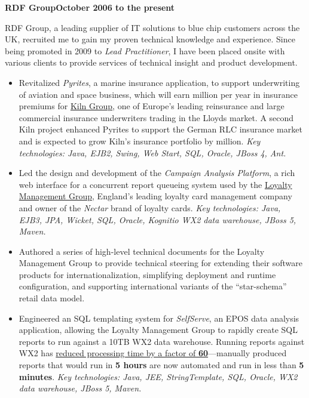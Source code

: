 \documentclass[a4paper,12pt]{article}
\newcommand{\head}[1]{\begin{center}{\large{\textbf{\sc{#1}}}}\nopagebreak\end{center}}
\newcommand{\jobheld}[2]{\textbf{#1\hfill #2}\nopagebreak}
\newcommand{\clientwork}[2]{\emph{#1\hfill #2}\nopagebreak}
\begin{document}
\head{Professional Experience}

\jobheld{RDF Group}{October 2006 to the present}

RDF Group, a leading supplier of IT solutions to blue chip customers across the UK, recruited me to gain my proven technical knowledge and experience.  Since being promoted in 2009 to \emph{Lead Practitioner}, I have been placed onsite with various clients to provide services of technical insight and product development.


\begin{itemize}

\item Revitalized \emph{Pyrites}, a marine insurance application, to support underwriting of aviation and space business, which will earn  million per year in insurance premiums for \href{http://www.kilngroup.com/}{Kiln Group}, one of Europe's leading reinsurance and large commercial insurance underwriters trading in the Lloyds market.  A second Kiln project enhanced Pyrites to support the German RLC insurance market and is expected to grow  Kiln's insurance portfolio by  million.  \emph{Key technologies: Java, EJB2, Swing, Web Start, SQL, Oracle, JBoss 4, Ant.}

\item Led the design and development of the \emph{Campaign Analysis Platform}, a rich web interface for a concurrent report queueing system used by the \href{http://www.loyalty.co.uk/}{Loyalty Management Group}, England's leading loyalty card management company and owner of the \emph{Nectar} brand of loyalty cards.  \emph{Key technologies: Java, EJB3, JPA, Wicket, SQL, Oracle, Kognitio WX2 data warehouse, JBoss 5, Maven.}

\end{itemize}


\begin{itemize}

\item Authored a series of high-level technical documents for the Loyalty Management Group to provide technical steering for extending their software products for internationalization, simplifying deployment and runtime configuration, and supporting international variants of the ``star-schema'' retail data model.

\item Engineered an SQL templating system for \emph{SelfServe}, an EPOS data analysis application, allowing the Loyalty Management Group to rapidly create SQL reports to run against a 10TB WX2 data warehouse.  Running reports against WX2 has \href{http://www.kognitio.com/casestudies/casestudy_lmg.php}{reduced processing time by a factor of \textbf{60}}---manually produced reports that would run in \textbf{5 hours} are now automated and run in less than \textbf{5 minutes}.  \emph{Key technologies: Java, JEE, StringTemplate, SQL, Oracle, WX2 data warehouse, JBoss 5, Maven.}

\end{itemize}
\end{document}
